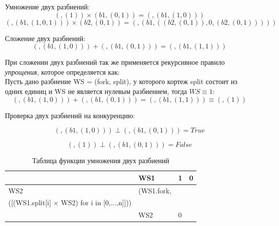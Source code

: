 \documentclass[a4paper,14pt]{article}
\begin{document}
Умножение двух разбиений:
\begin{equation}
	(, (1)) \times (b1, (0,1)) = (, (b1, (1,0)))
	\nonumber
\end{equation}
\begin{equation}
	(, (b1, (1,0, 1))) \times (b2, (0,1)) = (, (b1, ((b2, (0,1)),0, (b2, (0,1)))))
	\nonumber
\end{equation}

Сложение двух разбиений:
\begin{equation}
	(, (b1, (1,0))) + (, (b1, (0,1))) = (, (b1, (1,1))) 
	\nonumber
\end{equation}

При сложении двух разбиений так же применяется рекурсивное правило \textit{упрощения}, которое определяется как:\\
 Пусть дано разбиение WS = (fork, split), у которого кортеж split состоит из одних единиц и WS не является нулевым разбиением, тогда $WS \equiv 1$:
\begin{equation}
	(, (b1, (1,0))) + (, (b1, (0,1))) = (, (b1, (1,1))) \equiv (, (1))
	\nonumber
\end{equation}

Проверка двух разбиений на конкуренцию:

\begin{equation}
	(, (b1, (1,0))) \perp (, (b1, (0,1))) = True
	\nonumber
\end{equation}

\begin{equation}
	(, (1)) \perp (, (b1, (0,1))) = False 
	\nonumber
\end{equation}



\begin{table}
    \begin{tabular}{|l|>{\centering}m{8cm} |l|l|}
    \hline
    ~   & WS1                                                                              & 1       & 0       \\ \hline
    WS2 & (WS1.fork,\\
    ([(WS1.split[i] $\times$ WS2) for i in [0,...,n]]))\\
      & WS2  & 0    \\ \hline
    \end{tabular}
\caption{Таблица функции умножения двух разбиений}\label{tab:mult}
\end{table}
\end{document}
